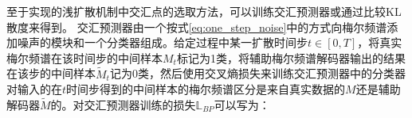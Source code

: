 %
至于实现的浅扩散机制中交汇点的选取方法，可以训练交汇预测器或通过比较KL散度来得到。
交汇预测器由一个按式\eqref{eq:one_step_noise}中的方式向梅尔频谱添加噪声的模块和一个分类器组成。给定过程中某一扩散时间步$t\in[0, T]$，将真实梅尔频谱在该时间步的中间样本$M_t$标记为1类，将辅助梅尔频谱解码器输出的结果在该步的中间样本$\widetilde{M}_t$记为0类，然后使用交叉熵损失来训练交汇预测器中的分类器对输入的在$t$时间步得到的中间样本的梅尔频谱区分是来自真实数据的$M$还是辅助解码器$\widetilde{M}$的。对交汇预测器训练的损失$\mathbb{L}_{BP}$可以写为：
